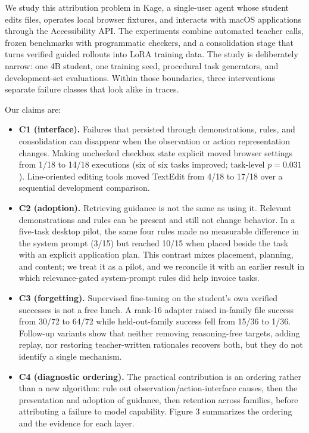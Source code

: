 \documentclass[
  10pt,
]{article}
\providecommand{\tightlist}{%
  \setlength{\itemsep}{0pt}\setlength{\parskip}{0pt}}
\begin{document}
We study this attribution problem in Kage, a single-user agent whose
student edits files, operates local browser fixtures, and interacts with
macOS applications through the Accessibility API. The experiments
combine automated teacher calls, frozen benchmarks with programmatic
checkers, and a consolidation stage that turns verified guided rollouts
into LoRA training data. The study is deliberately narrow: one 4B
student, one training seed, procedural task generators, and
development-set evaluations. Within those boundaries, three
interventions separate failure classes that look alike in traces.

Our claims are:

\begin{itemize}
\tightlist
\item
  \textbf{C1 (interface).} Failures that persisted through
  demonstrations, rules, and consolidation can disappear when the
  observation or action representation changes. Making unchecked
  checkbox state explicit moved browser settings from 1/18 to 14/18
  executions (six of six tasks improved; task-level \(p=0.031\)).
  Line-oriented editing tools moved TextEdit from 4/18 to 17/18 over a
  sequential development comparison.
\item
  \textbf{C2 (adoption).} Retrieving guidance is not the same as using
  it. Relevant demonstrations and rules can be present and still not
  change behavior. In a five-task desktop pilot, the same four rules
  made no measurable difference in the system prompt (3/15) but reached
  10/15 when placed beside the task with an explicit application plan.
  This contrast mixes placement, planning, and content; we treat it as a
  pilot, and we reconcile it with an earlier result in which
  relevance-gated system-prompt rules did help invoice tasks.
\item
  \textbf{C3 (forgetting).} Supervised fine-tuning on the student's own
  verified successes is not a free lunch. A rank-16 adapter raised
  in-family file success from 30/72 to 64/72 while held-out-family
  success fell from 15/36 to 1/36. Follow-up variants show that neither
  removing reasoning-free targets, adding replay, nor restoring
  teacher-written rationales recovers both, but they do not identify a
  single mechanism.
\item
  \textbf{C4 (diagnostic ordering).} The practical contribution is an
  ordering rather than a new algorithm: rule out
  observation/action-interface causes, then the presentation and
  adoption of guidance, then retention across families, before
  attributing a failure to model capability. Figure 3 summarizes the
  ordering and the evidence for each layer.
\end{itemize}
\end{document}
